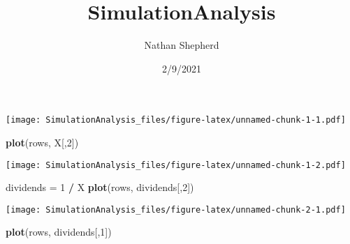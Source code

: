 \documentclass[
]{article}
\title{SimulationAnalysis}
\author{Nathan Shepherd}
\date{2/9/2021}
\newenvironment{Shaded}{\begin{snugshade}}{\end{snugshade}}
\newcommand{\CommentTok}[1]{\textcolor[rgb]{0.56,0.35,0.01}{\textit{#1}}}
\newcommand{\DecValTok}[1]{\textcolor[rgb]{0.00,0.00,0.81}{#1}}
\newcommand{\KeywordTok}[1]{\textcolor[rgb]{0.13,0.29,0.53}{\textbf{#1}}}
\newcommand{\NormalTok}[1]{#1}
\newcommand{\OperatorTok}[1]{\textcolor[rgb]{0.81,0.36,0.00}{\textbf{#1}}}
\newcommand{\StringTok}[1]{\textcolor[rgb]{0.31,0.60,0.02}{#1}}
\begin{document}
\maketitle

\begin{Shaded}
\end{Shaded}

\texttt{[image: SimulationAnalysis\_files/figure-latex/unnamed-chunk-1-1.pdf]}

\begin{Shaded}
\begin{Highlighting}[]
\KeywordTok{plot}\NormalTok{(rows, X[,}\DecValTok{2}\NormalTok{])}
\end{Highlighting}
\end{Shaded}

\texttt{[image: SimulationAnalysis\_files/figure-latex/unnamed-chunk-1-2.pdf]}

\begin{Shaded}
\begin{Highlighting}[]
\NormalTok{dividends =}\StringTok{ }\DecValTok{1} \OperatorTok{/}\StringTok{ }\NormalTok{X}
\KeywordTok{plot}\NormalTok{(rows, dividends[,}\DecValTok{2}\NormalTok{])}
\end{Highlighting}
\end{Shaded}

\texttt{[image: SimulationAnalysis\_files/figure-latex/unnamed-chunk-2-1.pdf]}

\begin{Shaded}
\begin{Highlighting}[]
\KeywordTok{plot}\NormalTok{(rows, dividends[,}\DecValTok{1}\NormalTok{])}
\end{Highlighting}
\end{Shaded}
\end{document}
